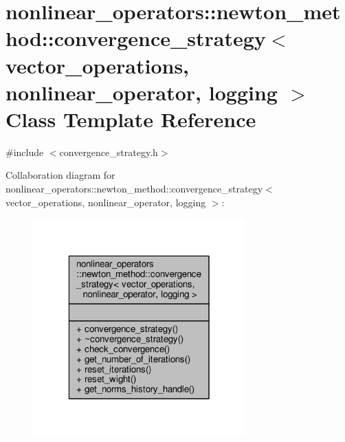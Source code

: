 \hypertarget{classnonlinear__operators_1_1newton__method_1_1convergence__strategy}{\section{nonlinear\-\_\-operators\-:\-:newton\-\_\-method\-:\-:convergence\-\_\-strategy$<$ vector\-\_\-operations, nonlinear\-\_\-operator, logging $>$ Class Template Reference}
\label{classnonlinear__operators_1_1newton__method_1_1convergence__strategy}
}


{\ttfamily \#include $<$convergence\-\_\-strategy.\-h$>$}



Collaboration diagram for nonlinear\-\_\-operators\-:\-:newton\-\_\-method\-:\-:convergence\-\_\-strategy$<$ vector\-\_\-operations, nonlinear\-\_\-operator, logging $>$\-:\nopagebreak
\begin{figure}[H]
\begin{center}
\leavevmode
\includegraphics[width=232pt]{classnonlinear__operators_1_1newton__method_1_1convergence__strategy__coll__graph}
\end{center}
\end{figure}
